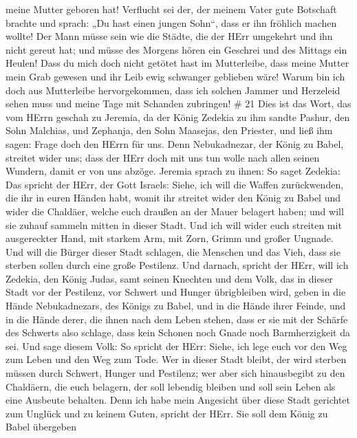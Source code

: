 meine Mutter geboren hat!  Verflucht sei der, der meinem
Vater gute Botschaft brachte und sprach: „Du hast einen jungen Sohn``,
dass er ihn fröhlich machen wollte!  Der Mann müsse sein
wie die Städte, die der HErr umgekehrt und ihn nicht gereut hat; und
müsse des Morgens hören ein Geschrei und des Mittags ein Heulen!
 Dass du mich doch nicht getötet hast im Mutterleibe, dass
meine Mutter mein Grab gewesen und ihr Leib ewig schwanger geblieben
wäre!  Warum bin ich doch aus Mutterleibe hervorgekommen,
dass ich solchen Jammer und Herzeleid sehen muss und meine Tage mit
Schanden zubringen! \# 21  Dies ist das Wort, das vom HErrn
geschah zu Jeremia, da der König Zedekia zu ihm sandte Pashur, den Sohn
Malchias, und Zephanja, den Sohn Maasejas, den Priester, und ließ ihm
sagen:  Frage doch den HErrn für uns. Denn Nebukadnezar, der
König zu Babel, streitet wider uns; dass der HErr doch mit uns tun wolle
nach allen seinen Wundern, damit er von uns abzöge.  Jeremia
sprach zu ihnen: So saget Zedekia:  Das spricht der HErr,
der Gott Israels: Siehe, ich will die Waffen zurückwenden, die ihr in
euren Händen habt, womit ihr streitet wider den König zu Babel und wider
die Chaldäer, welche euch draußen an der Mauer belagert haben; und will
sie zuhauf sammeln mitten in dieser Stadt.  Und ich will
wider euch streiten mit ausgereckter Hand, mit starkem Arm, mit Zorn,
Grimm und großer Ungnade.  Und will die Bürger dieser Stadt
schlagen, die Menschen und das Vieh, dass sie sterben sollen durch eine
große Pestilenz.  Und darnach, spricht der HErr, will ich
Zedekia, den König Judas, samt seinen Knechten und dem Volk, das in
dieser Stadt vor der Pestilenz, vor Schwert und Hunger übrigbleiben
wird, geben in die Hände Nebukadnezars, des Königs zu Babel, und in die
Hände ihrer Feinde, und in die Hände derer, die ihnen nach dem Leben
stehen, dass er sie mit der Schärfe des Schwerts also schlage, dass kein
Schonen noch Gnade noch Barmherzigkeit da sei.  Und sage
diesem Volk: So spricht der HErr: Siehe, ich lege euch vor den Weg zum
Leben und den Weg zum Tode.  Wer in dieser Stadt bleibt, der
wird sterben müssen durch Schwert, Hunger und Pestilenz; wer aber sich
hinausbegibt zu den Chaldäern, die euch belagern, der soll lebendig
bleiben und soll sein Leben als eine Ausbeute behalten. 
Denn ich habe mein Angesicht über diese Stadt gerichtet zum Unglück und
zu keinem Guten, spricht der HErr. Sie soll dem König zu Babel übergeben
